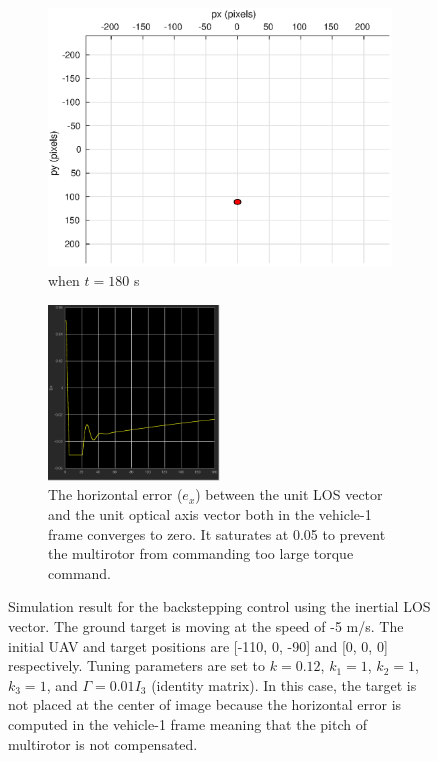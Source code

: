 \begin{figure}[htbp]
\begin{subfigure}[t]{0.32\linewidth}
		\includegraphics[width=\textwidth]{images/chapter4/inertial_camera_-5mps_180s}
		\caption{when $t=180$ s}
	\end{subfigure}	
	\begin{subfigure}[t]{0.8\linewidth}
		\centering
		\includegraphics[width=0.5\textwidth]{images/chapter4/inertial_Ex_-5mps}
		\caption{The horizontal error ($e_x$) between the unit LOS vector and the unit optical axis vector both in the vehicle-1 frame converges to zero. It saturates at 0.05 to prevent the multirotor from commanding too large torque command.}
	\end{subfigure}	
	\caption[Simulation result for the backstepping control using the inertial LOS vector.]{Simulation result for the backstepping control using the inertial LOS vector. The ground target is moving at the speed of -5 m/s. The initial UAV and target positions are [-110, 0, -90] and [0, 0, 0] respectively. Tuning parameters are set to $k=0.12$, $k_1=1$, $k_2=1$, $k_3=1$, and $\Gamma=0.01I_3$ (identity matrix). In this case, the target is not placed at the center of image because the horizontal error is computed in the vehicle-1 frame meaning that the pitch of multirotor is not compensated.}
	\label{inertial_-5mps}
\end{figure}

